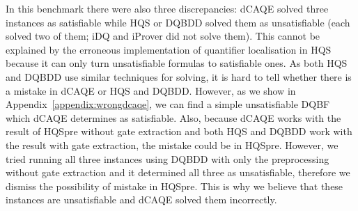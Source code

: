 \documentclass[
  digital, %
  color,
  twoside, %
  table,   %
  nolof,     %
  nolot,     %
]{fithesis3}
\theoremstyle{definition}
\theoremstyle{remark}
\begin{document}
In this benchmark there were also three discrepancies: dCAQE solved three instances as satisfiable while HQS or DQBDD solved them as unsatisfiable (each solved two of them; iDQ and iProver did not solve them). This cannot be explained by the erroneous implementation of quantifier localisation in HQS because it can only turn unsatisfiable formulas to satisfiable ones. As both HQS and DQBDD use similar techniques for solving, it is hard to tell whether there is a mistake in dCAQE or HQS and DQBDD. However, as we show in Appendix~\ref{appendix:wrongdcaqe}, we can find a simple unsatisfiable DQBF which dCAQE determines as satisfiable. Also, because dCAQE works with the result of HQSpre without gate extraction and both HQS and DQBDD work with the result with gate extraction, the mistake could be in HQSpre. However, we tried running all three instances using DQBDD with only the preprocessing without gate extraction and it determined all three as unsatisfiable, therefore we dismiss the possibility of mistake in HQSpre. This is why we believe that these instances are unsatisfiable and dCAQE solved them incorrectly.
\end{document}
